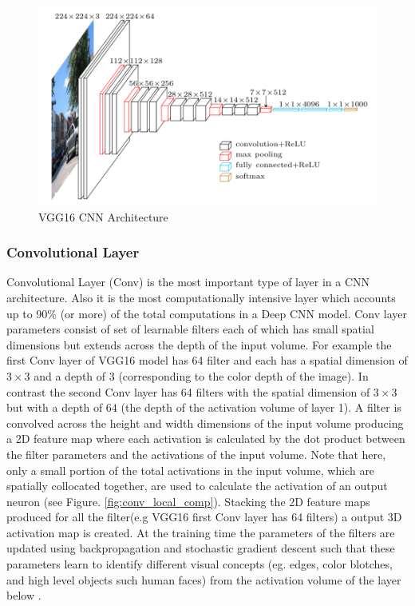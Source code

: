 \begin{figure}
  \includegraphics[width=\columnwidth]{./images/vgg16}
  \caption{VGG16 CNN Architecture}
  \label{fig:vgg16}
\end{figure}

\subsubsection{Convolutional Layer}
Convolutional Layer (Conv) is the most important type of layer in a CNN architecture. Also it is the most computationally intensive layer which accounts up to 90\% (or more) of the total computations in a Deep CNN model.
Conv layer parameters consist of set of learnable filters each of which has small spatial dimensions but extends across the depth of the input volume.
For example the first Conv layer of VGG16 model has 64 filter and each has a spatial dimension of $3\times3$ and a depth of $3$ (corresponding to the color depth of the image). In contrast the second Conv layer has 64 filters with the spatial dimension of $3\times3$ but with a depth of $64$ (the depth of the activation volume of layer 1).
A filter is convolved across the height and width dimensions of the input volume producing a 2D feature map where each activation is calculated by the dot product between the filter parameters and the activations of the input volume.
Note that here, only a small portion of the total activations in the input volume, which are spatially collocated together, are used to calculate the activation of an output neuron (see Figure. \ref{fig:conv_local_comp}).
Stacking the 2D feature maps produced for all the filter(e.g VGG16 first Conv layer has 64 filters) a output 3D activation map is created.
At the training time the parameters of the filters are updated using backpropagation and stochastic gradient descent such that these parameters learn to identify different visual concepts (eg. edges, color blotches, and high level objects such human faces) from the activation volume of the layer below \cite{zeiler2014visualizing}.


